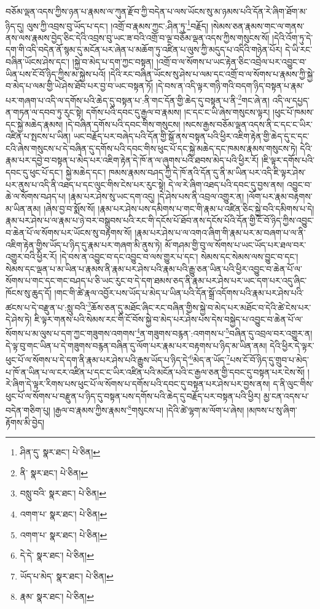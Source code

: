 བཅོམ་ལྡན་འདས་ཀྱིས་ཉན་པ་རྣམས་ལ་ཀུན་རྫོབ་ཀྱི་བདེན་པ་ལས་ཡོངས་སུ་མ་ཉམས་པའི་དོན་རེ་ཞིག་ཐོག་མ་ཉིད་དུ། ལུས་ཀྱི་འབྲས་བུ་ཡོད་པ་དང་། །འགྲོ་བ་རྣམས་ཀྱང་:ཤིན་ཏུ་\footnote{ཤིན་དུ་  སྣར་ཐང་།  པེ་ཅིན། }བརྗོད། །སེམས་ཅན་རྣམས་གང་ལ་གནས་ནས་ལས་རྣམས་བྱེད་ཅིང་དེའི་འབྲས་བུ་ཡང་ཟ་བའི་འགྲོ་བ་ལྔ་བཅོམ་ལྡན་འདས་ཀྱིས་གསུངས་སོ། །དེའི་འོག་ཏུ་དེ་དག་གི་འདི་བདེན་ནོ་སྙམ་དུ་མངོན་པར་ཞེན་པ་མཆོག་ཏུ་འཛིན་པ་ལུས་ཀྱི་མདུད་པ་འདིའི་གཉེན་པོར། དེ་ཡི་རང་བཞིན་ཡོངས་ཤེས་དང་། །སྐྱེ་བ་མེད་པ་དག་ཀྱང་བསྟན། །འགྲོ་བ་ལ་སོགས་པ་ཡང་རྟེན་ཅིང་འབྲེལ་པར་འབྱུང་བ་ཡིན་པས་ངོ་བོ་ཉིད་ཀྱིས་མ་སྐྱེས་པའོ། །དེའི་རང་བཞིན་ཡོངས་སུ་ཤེས་པ་ལམ་དང་འགྲོ་བ་ལ་སོགས་པ་རྣམས་ཀྱི་སྐྱེ་བ་མེད་པ་ལམ་གྱི་ཡེ་ཤེས་ཐོབ་པར་བྱ་བ་ཡང་བསྟན་ཏོ། །དེ་བས་ན་འདི་ལྟར་གཉི་གའི་བདག་ཉིད་བསྟན་པ་རྣམ་པར་གཞག་པ་འདི་ལ་དགོས་པའི་ཆེད་དུ་བསྟན་པ་:ནི་གང་དོན་གྱི་ཆེད་དུ་བསྟན་པ་ནི་\footnote{ནི་  སྣར་ཐང་།  པེ་ཅིན། }གང་ཞེ་ན། འདི་ལ་དཔྱད་ན་གཏན་ལ་དབབ་ཏུ་རུང་སྟེ། དགོས་པའི་དབང་དུ་རྒྱལ་བ་རྣམས། །ང་དང་ང་ཡི་ཞེས་གསུངས་ལྟར། །ཕུང་པོ་ཁམས་དང་སྐྱེ་མཆེད་རྣམས། །དེ་བཞིན་དགོས་པའི་དབང་གིས་གསུངས། །སངས་རྒྱས་བཅོམ་ལྡན་འདས་ནི་ང་དང་ང་ཡིར་འཛིན་པ་སྤངས་པ་ཡིན། ཡང་བརྗོད་པར་བཞེད་པའི་དོན་གྱི་སྒོ་ནས་བསྟན་པའི་ཕྱིར་འཇིག་རྟེན་གྱི་ཆེད་དུ་ང་དང་ངའི་ཞེས་གསུངས་པ་དེ་བཞིན་དུ་དགོས་པའི་དབང་གིས་ཕུང་པོ་དང་སྐྱེ་མཆེད་དང་ཁམས་རྣམས་གསུངས་ཏེ། དེའི་རྣམ་པར་དབྱེ་བ་བསྟན་པ་མེད་པར་འཇིག་རྟེན་དེ་ཁོ་ན་ལ་ཞུགས་པའི་ཐབས་མེད་པའི་ཕྱིར་རོ། །ཇི་ལྟར་དགོས་པའི་དབང་དུ་ཕུང་པོ་དང་། སྐྱེ་མཆེད་དང་། ཁམས་རྣམས་བཤད་ཀྱི་དེ་ཁོ་ནའི་དོན་དུ་ནི་མ་ཡིན་པར་འདི་ཇི་ལྟར་ཤེས་པར་ནུས་པ་འདི་ནི་འཐད་པ་དང་ལུང་གིས་ངེས་པར་རུང་སྟེ། དེ་ལ་རེ་ཞིག་འཐད་པའི་དབང་དུ་བྱས་ནས། འབྱུང་བ་ཆེ་ལ་སོགས་བཤད་པ། །རྣམ་པར་ཤེས་སུ་ཡང་དག་འདུ། །དེ་ཤེས་པས་ནི་འབྲལ་འགྱུར་ན། །ལོག་པར་རྣམ་བརྟགས་མ་ཡིན་ནམ། །ཞེས་བྱ་བ་སྨོས་སོ། །རྣམ་པར་ཤེས་པས་དམིགས་པ་གང་གི་རྣམ་པ་འཛིན་ཅིང་སྐྱེ་བའི་དམིགས་པ་དེ། རྣམ་པར་ཤེས་པ་ལ་རྣམ་པ་ཉེ་བར་བསྒྲུབས་པའི་རང་གི་དངོས་པོ་ཐོབ་ནས་དངོས་པོའི་དོན་གྱི་ངོ་བོ་ཉིད་ཀྱིས་འབྱུང་བ་ཆེན་པོ་ལ་སོགས་པར་ཡོངས་སུ་བརྟགས་སོ། །རྣམ་པར་ཤེས་པ་ལ་འགའ་ཞིག་གི་རྣམ་པར་མ་བཞག་པ་ལ་ནི་འཇིག་རྟེན་གྱིས་ཡོད་པ་ཉིད་དུ་རྣམ་པར་གཞག་མི་ནུས་ཏེ། མོ་གཤམ་གྱི་བུ་ལ་སོགས་པ་ཡང་ཡོད་པར་ཐལ་བར་འགྱུར་བའི་ཕྱིར་རོ། །དེ་བས་ན་འབྱུང་བ་དང་འབྱུང་བ་ལས་གྱུར་པ་དང་། སེམས་དང་སེམས་ལས་བྱུང་བ་དང་། སེམས་དང་ལྡན་པ་མ་ཡིན་པ་རྣམས་ནི་རྣམ་པར་ཤེས་པའི་རྣམ་པའི་རྒྱུ་ཅན་ཡིན་པའི་ཕྱིར་འབྱུང་བ་ཆེན་པོ་ལ་སོགས་པ་གང་དང་གང་བཤད་པ་ཅི་ཡང་རུང་བ་དེ་དག་ཐམས་ཅད་ནི་རྣམ་པར་ཤེས་པར་ཡང་དག་པར་འདུ་ཞིང་ཁོངས་སུ་ཆུད་དོ། །གང་གི་ཚེ་རྣལ་འབྱོར་པས་ཡོད་པ་མེད་པ་ཡིན་པའི་དོན་སྒྲོ་འདོགས་པའི་རྣམ་པར་ཤེས་པའི་ཚངས་པ་དེ་བརྫུན་པ་:སླུ་བའི་\footnote{བསླུ་བའི་  སྣར་ཐང་།  པེ་ཅིན། }ཆོས་ཅན་དུ་མཐོང་ཞིང་རང་བཞིན་གྱིས་སྐྱེ་བ་མེད་པར་མཐོང་བ་དེའི་ཚེ་ངེས་པར་དེ་ཤེས་ཏེ། ཇི་ལྟར་གནས་པའི་སེམས་རང་གི་ངོ་བོས་སྐྱེ་བ་མེད་པར་ཤེས་པས་དེས་བསྐྱེད་པ་འབྱུང་བ་ཆེན་པོ་ལ་སོགས་པ་མ་ལུས་པ་དག་ཀྱང་གཟུགས་འགགས་\footnote{འགག་པ་  སྣར་ཐང་།  པེ་ཅིན། }ན་གཟུགས་བརྙན་:འགགས་པ་\footnote{འགག་པ་  སྣར་ཐང་།  པེ་ཅིན། }བཞིན་དུ་འབྲལ་བར་འགྱུར་ན། དེ་ལྟ་བུ་གང་ཡིན་པ་དེ་གཟུགས་བརྙན་བཞིན་དུ་ལོག་པར་རྣམ་པར་བརྟགས་པ་ཉིད་མ་ཡིན་ནམ། དེའི་ཕྱིར་དེ་ལྟར་ཕུང་པོ་ལ་སོགས་པ་དེ་དག་ནི་རྣམ་པར་ཤེས་པའི་རྒྱུས་ཡོད་པ་ཉིད་དེ་\footnote{དེ་དེ་  སྣར་ཐང་།  པེ་ཅིན། }མེད་ན་ཡོད་\footnote{ཡོད་པ་མེད་  སྣར་ཐང་།  པེ་ཅིན། }པས་ངོ་བོ་ཉིད་དུ་གྲུབ་པ་མེད་པ་ཁོ་ན་ཡིན་པ་ལ་ངར་འཛིན་པ་དང་ང་ཡིར་འཛིན་པའི་མངོན་པའི་ང་རྒྱལ་ཅན་གྱི་དབང་དུ་བསྟན་པར་ངེས་སོ། །རེ་ཞིག་དེ་ལྟར་རིགས་པས་ཕུང་པོ་ལ་སོགས་པ་དགོས་པའི་དབང་དུ་བསྟན་པར་ཤེས་པར་བྱས་ནས། ད་ནི་ལུང་གིས་ཕུང་པོ་ལ་སོགས་པ་བརྫུན་པ་ཉིད་དུ་བསྟན་པས་དགོས་པའི་ཆེད་དུ་བརྗོད་པར་བསྟན་པའི་ཕྱིར། མྱ་ངན་འདས་པ་བདེན་གཅིག་པུ། །རྒྱལ་བ་རྣམས་ཀྱིས་རྣམས་\footnote{རྣམ་  སྣར་ཐང་།  པེ་ཅིན། }གསུངས་པ། །དེའི་ཚེ་ལྷག་མ་ལོག་པ་ཞེས། །མཁས་པ་སུ་ཞིག་རྟོགས་མི་བྱེད། 